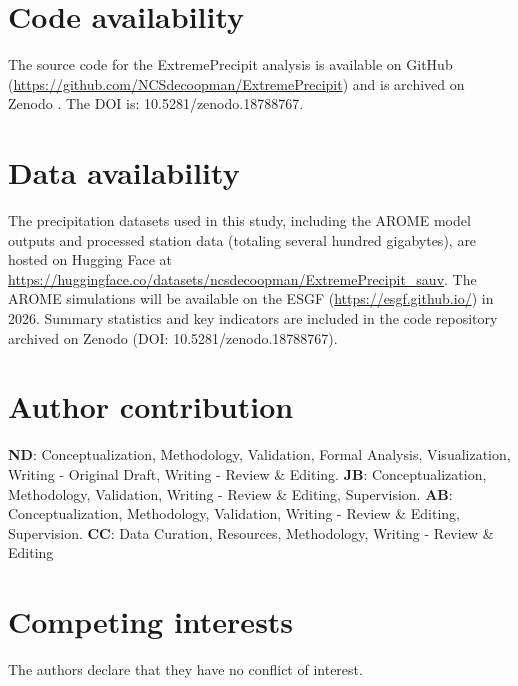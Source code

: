 \documentclass[hess, manuscript]{copernicus}
\begin{document}
\section*{Code availability}
The source code for the ExtremePrecipit analysis is available on GitHub (\url{https://github.com/NCSdecoopman/ExtremePrecipit}) and is archived on Zenodo \citep{decoopman_zenodo_2026}. The DOI is: 10.5281/zenodo.18788767.

\section*{Data availability}
The precipitation datasets used in this study, including the AROME model outputs and processed station data (totaling several hundred gigabytes), are hosted on Hugging Face at \url{https://huggingface.co/datasets/ncsdecoopman/ExtremePrecipit_sauv}. The AROME simulations will be available on the ESGF (\url{https://esgf.github.io/}) in 2026. Summary statistics and key  indicators are included in the code repository archived on Zenodo (DOI: 10.5281/zenodo.18788767).

\section*{Author contribution}
\textbf{ND}: Conceptualization, Methodology, Validation, Formal Analysis, Visualization, Writing - Original Draft, Writing - Review \& Editing. \textbf{JB}: Conceptualization, Methodology, Validation, Writing - Review \& Editing, Supervision. \textbf{AB}: Conceptualization, Methodology, Validation, Writing - Review \& Editing, Supervision. \textbf{CC}: Data Curation, Resources, Methodology, Writing - Review \& Editing

\section*{Competing interests}
The authors declare that they have no conflict of interest.
\end{document}
